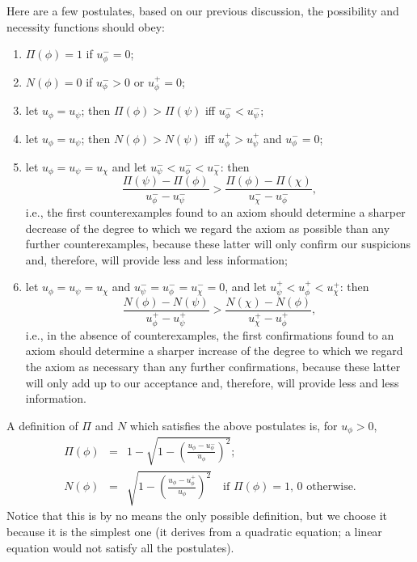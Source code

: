 \documentclass{llncs}
\begin{document}
Here are a few postulates, based on our previous discussion, the possibility
and necessity functions should obey:
\begin{enumerate}
\item $\Pi(\phi) = 1$ if $u_\phi^- = 0$;
\item $N(\phi) = 0$ if $u_\phi^- > 0$ or $u_\phi^+ = 0$;
\item let $u_\phi = u_\psi$; then $\Pi(\phi) > \Pi(\psi)$ iff $u_\phi^- < u_\psi^-$;
\item let $u_\phi = u_\psi$; then $N(\phi) > N(\psi)$ iff $u_\phi^+ > u_\psi^+$ and $u_\phi^- = 0$;
\item let $u_\phi = u_\psi = u_\chi$ and let $u_\psi^- < u_\phi^- < u_\chi^-$: then
  \[
    \frac{\Pi(\psi) - \Pi(\phi)}{u_\phi^- - u_\psi^-} > \frac{\Pi(\phi) - \Pi(\chi)}{u_\chi^- - u_\phi^-},
  \]
  i.e., the first counterexamples found to an axiom should determine a sharper decrease
  of the degree to which we regard the axiom as possible than any further counterexamples,
  because these latter will only confirm our suspicions and, therefore, will provide
  less and less information;
\item let $u_\phi = u_\psi = u_\chi$ and $u_\psi^- = u_\phi^- = u_\chi^- = 0$,
  and let $u_\psi^+ < u_\phi^+ < u_\chi^+$: then
  \[
    \frac{N(\phi) - N(\psi)}{u_\phi^+ - u_\psi^+} > \frac{N(\chi) - N(\phi)}{u_\chi^+ - u_\phi^+},
  \]
  i.e., in the absence of counterexamples,
  the first confirmations found to an axiom should determine a sharper increase
  of the degree to which we regard the axiom as necessary than any further confirmations,
  because these latter will only add up to our acceptance and, therefore, will provide
  less and less information.%
\end{enumerate}

A definition of $\Pi$ and $N$ which satisfies the above postulates is, for $u_\phi > 0$,
\begin{eqnarray}
  \Pi(\phi) &=& 1 - \sqrt{1 - \left(\frac{u_\phi - u_\phi^-}{u_\phi}\right)^2}; \\
  N(\phi) &=& \sqrt{1 - \left(\frac{u_\phi - u_\phi^+}{u_\phi}\right)^2}\quad
    \mbox{if $\Pi(\phi) = 1$, 0 otherwise.}
\end{eqnarray}
Notice that this is by no means the only possible definition, but we choose it because
it is the simplest one (it derives from a quadratic equation; a linear equation would
not satisfy all the postulates).
\end{document}
